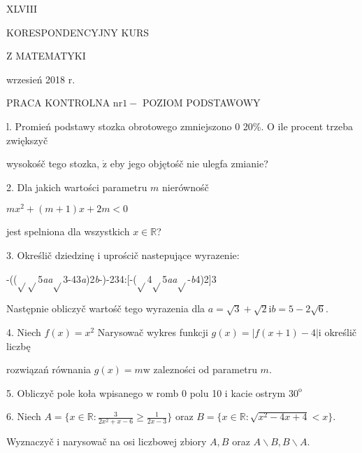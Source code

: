 \documentclass[a4paper,12pt]{article}
\begin{document}
XLVIII

KORESPONDENCYJNY KURS

Z MATEMATYKI

wrzesień 2018 r.

PRACA KONTROLNA $\mathrm{n}\mathrm{r} 1 -$ POZIOM PODSTAWOWY

l. Promień podstawy stozka obrotowego zmniejszono $0$ 20\%. $\mathrm{O}$ ile procent trzeba zwiększyč

wysokośč tego stozka, $\dot{\mathrm{z}}$ eby jego objętośč nie ulegfa zmianie?

2. Dla jakich wartości parametru $m$ nierównośč

$mx^{2}+(m+1)x+2m<0$

jest spelniona dla wszystkich $x\in \mathbb{R}$?

3. Określič dziedzinę $\mathrm{i}$ uprościč nastepujące wyrazenie:

-(($\sqrt{}\sqrt{}$5{\it aa}$\sqrt{}$3-43{\it a})2{\it b}-)-234:[-($\sqrt{}$4$\sqrt{}$5{\it aa}$\sqrt{}$-{\it b}4)2]3

Następnie obliczyč wartośč tego wyrazenia dla $a=\sqrt{3}+\sqrt{2} \mathrm{i} b=5-2\sqrt{6}.$

4. Niech $f(x) = x^{2}$ Narysowač wykres funkcji $g(x) = |f(x+1) -4| \mathrm{i}$ określič liczbę

rozwiązań równania $g(x)=m\mathrm{w}$ zalezności od parametru $m.$

5. Obliczyč pole koła wpisanego $\mathrm{w}$ romb $0$ polu 10 $\mathrm{i}$ kacie ostrym $30^{\mathrm{o}}$

6. Niech $A = \displaystyle \{x\in \mathbb{R}:\frac{3}{2x^{2}+x-6}\geq\frac{1}{2x-3}\}$ oraz $B = \{x\in \mathbb{R}:\sqrt{x^{2}-4x+4}<x\}.$

Wyznaczyč $\mathrm{i}$ narysowač na osi liczbowej zbiory $A, B$ oraz $A\backslash B, B\backslash A.$
\end{document}
